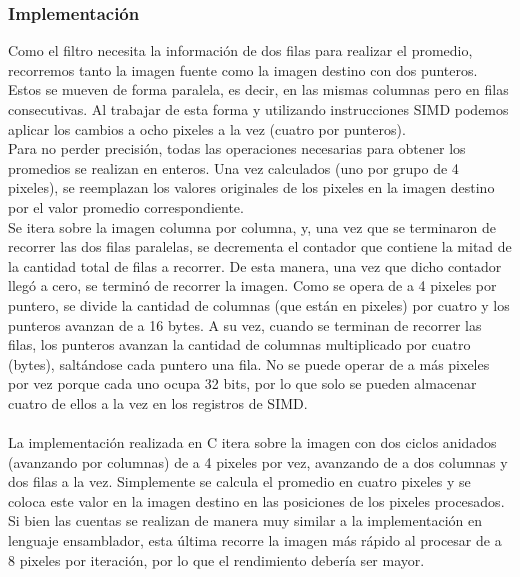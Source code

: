 \documentclass[a4paper]{article}
\begin{document}
\subsubsection{Implementación}
Como el filtro necesita la información de dos filas para realizar el promedio, recorremos tanto la imagen fuente como la imagen destino con dos punteros. Estos se mueven de forma paralela, es decir, en las mismas columnas pero en filas consecutivas. Al trabajar de esta forma y utilizando instrucciones SIMD podemos aplicar los cambios a ocho pixeles a la vez (cuatro por punteros).
\\Para no perder precisión, todas las operaciones necesarias para obtener los promedios se realizan en enteros. Una vez calculados (uno por grupo de 4 pixeles), se reemplazan los valores originales de los pixeles en la imagen destino por el valor promedio correspondiente.
\\Se itera sobre la imagen columna por columna, y, una vez que se terminaron de recorrer las dos filas paralelas, se decrementa el contador que contiene la mitad de la cantidad total de filas a recorrer. De esta manera, una vez que dicho contador llegó a cero, se terminó de recorrer la imagen. Como se opera de a 4 pixeles por puntero, se divide la cantidad de columnas (que están en pixeles) por cuatro y los punteros avanzan de a 16 bytes. A su vez, cuando se terminan de recorrer las filas, los punteros avanzan la cantidad de columnas multiplicado por cuatro (bytes), saltándose cada puntero una fila. No se puede operar de a más pixeles por vez porque cada uno ocupa 32 bits, por lo que solo se pueden almacenar cuatro de ellos a la vez en los registros de SIMD.
\\
\\
La implementación realizada en C itera sobre la imagen con dos ciclos anidados (avanzando por columnas) de a 4 pixeles por vez, avanzando de a dos columnas y dos filas a la vez. Simplemente se calcula el promedio en cuatro pixeles y se coloca este valor en la imagen destino en las posiciones de los pixeles procesados. Si bien las cuentas se realizan de manera muy similar a la implementación en lenguaje ensamblador, esta última recorre la imagen más rápido al procesar de a 8 pixeles por iteración, por lo que el rendimiento debería ser mayor.
\\
\end{document}
